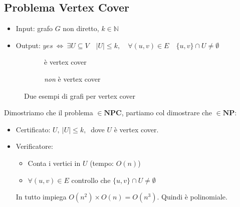\documentclass[a4paper]{article}
\theoremstyle{definition}
\newcommand{\N}{\mathbb{N}}
\newcommand{\np}{\mathbf{NP}}
\newcommand{\npc}{\mathbf{NPC}}
\begin{document}
	\subsection{Problema Vertex Cover}
		\begin{itemize}
			\item Input: grafo $ G $ non diretto, $ k \in \N $
			\item Output: $ yes\ \Leftrightarrow\ \exists U\subseteq V\quad \vert U\vert \leq k,\quad \forall(u,v)\in E\quad \{u, v\}\cap U \neq \emptyset $
		\end{itemize}
		\begin{figure}[h!]
			\begin{subfigure}{.5\textwidth}
				\centering
				\caption{è vertex cover}
			\end{subfigure}
			\begin{subfigure}{.5\textwidth}
				\centering
				\caption{\textit{non} è vertex cover}
			\end{subfigure}
			\caption{Due esempi di grafi per vertex cover}
		\end{figure}
		
		Dimostriamo che il problema $ \in \npc $, partiamo col dimostrare che $ \in \np $:		
		\begin{itemize}
			\item Certificato: $ U,\ \vert U\vert \leq k,\ $ dove $ U $ è vertex cover.
			\item Verificatore:
			\begin{itemize}
				\item Conta i vertici in $ U $ (tempo: $ O(n) $)
				\item $ \forall (u, v)\in E $ controllo che $ \{u, v\}\cap U\neq \emptyset $
			\end{itemize}
			In tutto impiega $ O(n^2)\times O(n) = O(n^3) $. Quindi è polinomiale.
		\end{itemize}
		 
\end{document}
